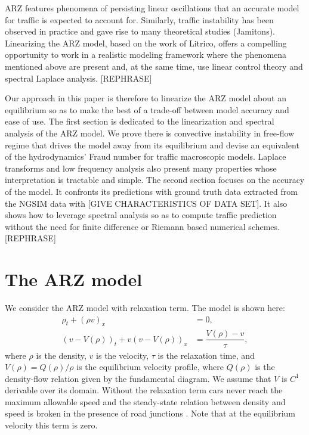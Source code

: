 \documentclass[a4paper, 10pt, conference]{ieeeconf}      %
\begin{document}
ARZ features phenomena of persisting linear oscillations that an accurate model for traffic is expected to account for. Similarly, traffic instability has been observed in practice and gave rise to many theoretical studies (Jamitons). Linearizing the ARZ model, based on the work of Litrico, offers a compelling opportunity to work in a realistic modeling framework where the phenomena mentioned above are present and, at the same time, use linear control theory and spectral Laplace analysis. [REPHRASE]

Our approach in this paper is therefore to linearize the ARZ model about an equilibrium so as to make the best of a trade-off between model accuracy and ease of use. The first section is dedicated to the linearization and spectral analysis of the ARZ model. We prove there is convective instability in free-flow regime that drives the model away from its equilibrium and devise an equivalent of the hydrodynamics' Fraud number for traffic macroscopic models. Laplace transforms and low frequency analysis also present many properties whose interpretation is tractable and simple. The second section focuses on the accuracy of the model. It confronts its predictions with ground truth data extracted from the NGSIM data with [GIVE CHARACTERISTICS OF DATA SET]. It also shows how to leverage spectral analysis so as to compute traffic prediction without the need for finite difference or Riemann based numerical schemes. [REPHRASE]

\section{The ARZ model} \label{ARZSection}

We consider the ARZ model with relaxation term. The model is shown here: 
\begin{align} 
\rho_t + (\rho v)_x &= 0, \label{ARZ1} \\
(v - V(\rho))_t + v(v - V(\rho))_x &=\dfrac{V(\rho) - v}{\tau} \label{ARZ2},
\end{align}
where $\rho$ is the density, $v$ is the velocity, $\tau$ is the relaxation time, and $V(\rho) = Q(\rho)/\rho$ is the equilibrium velocity profile, where $Q(\rho)$ is the density-flow relation given by the fundamental diagram. We assume that $V$ is $C^{1}$ derivable over its domain. Without the relaxation term cars never reach the maximum allowable speed \cite{R_improved} and the steady-state relation between density and speed is broken in the presence of road junctions \cite{jin2015}. Note that at the equilibrium velocity this term is zero. 
\end{document}
